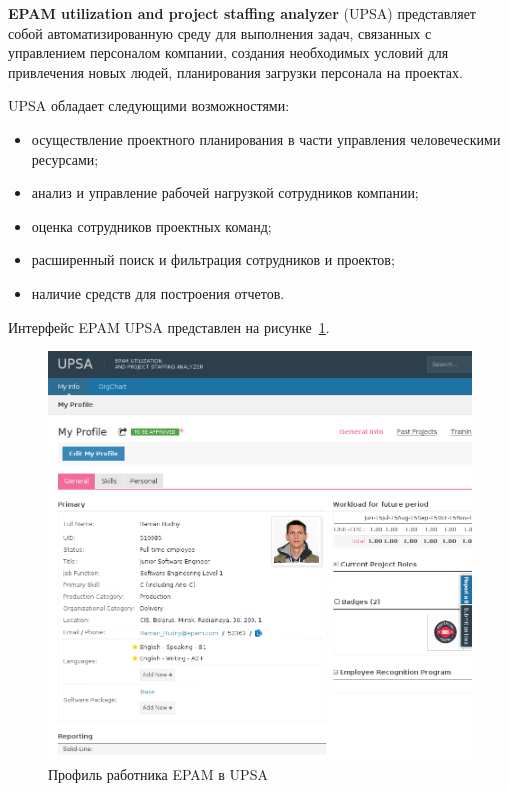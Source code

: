 \newpage

\textbf{EPAM utilization and project staffing analyzer} (UPSA) представляет собой
автоматизированную среду для выполнения задач, связанных с управлением персоналом компании,
создания необходимых условий для привлечения новых людей, планирования загрузки персонала на проектах.

UPSA обладает следующими возможностями:
\begin{itemize}
\item осуществление проектного планирования в части управления человеческими ресурсами;
\item анализ и управление рабочей нагрузкой сотрудников компании;
\item оценка сотрудников проектных команд;
\item расширенный поиск и фильтрация сотрудников и проектов;
\item наличие средств для построения отчетов.
\end{itemize}

Интерфейс EPAM UPSA представлен на рисунке~\ref{pic:epam_upsa}.

\begin{figure}[h!]
  \centering
  \includegraphics[width=150mm]{pic/epam_upsa.png}
  \caption{Профиль работника EPAM в UPSA}
  \label{pic:epam_upsa}
\end{figure}
